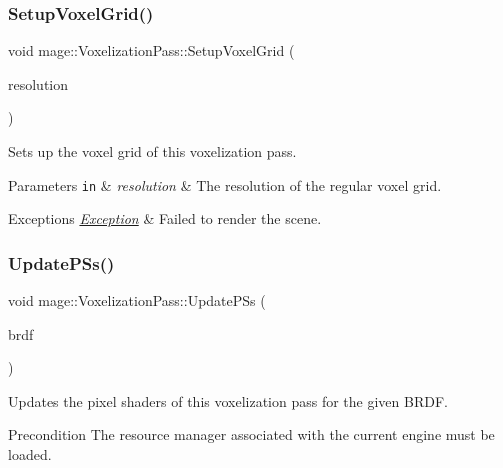 \subsubsection{\texorpdfstring{Setup\+Voxel\+Grid()}{SetupVoxelGrid()}}
{\footnotesize\ttfamily void mage\+::\+Voxelization\+Pass\+::\+Setup\+Voxel\+Grid (\begin{DoxyParamCaption}\item[{size\+\_\+t}]{resolution }\end{DoxyParamCaption})\hspace{0.3cm}{\ttfamily [private]}}

Sets up the voxel grid of this voxelization pass.


\begin{DoxyParams}[1]{Parameters}
\mbox{\tt in}  & {\em resolution} & The resolution of the regular voxel grid. \\
\hline
\end{DoxyParams}

\begin{DoxyExceptions}{Exceptions}
{\em \hyperlink{classmage_1_1_exception}{Exception}} & Failed to render the scene. \\
\hline
\end{DoxyExceptions}
\hypertarget{classmage_1_1_voxelization_pass_a573f27eb1c6fdb5701ee0ccf3cbef91c}{}\label{classmage_1_1_voxelization_pass_a573f27eb1c6fdb5701ee0ccf3cbef91c} 
\subsubsection{\texorpdfstring{Update\+P\+Ss()}{UpdatePSs()}}
{\footnotesize\ttfamily void mage\+::\+Voxelization\+Pass\+::\+Update\+P\+Ss (\begin{DoxyParamCaption}\item[{\hyperlink{namespacemage_af1044f87544bc38427766a8c795d2f26}{B\+R\+D\+F\+Type}}]{brdf }\end{DoxyParamCaption})\hspace{0.3cm}{\ttfamily [private]}}

Updates the pixel shaders of this voxelization pass for the given B\+R\+DF.

\begin{DoxyPrecond}{Precondition}
The resource manager associated with the current engine must be loaded. 
\end{DoxyPrecond}

